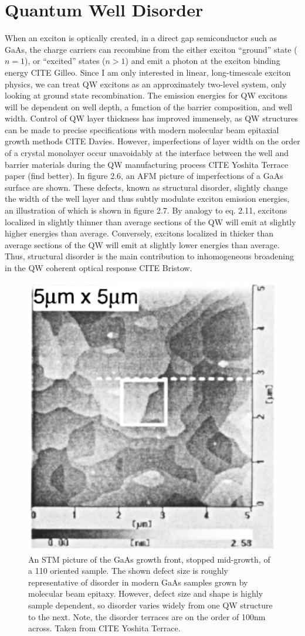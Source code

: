 \section{Quantum Well Disorder}
\indent When an exciton is optically created, in a direct gap semiconductor such as GaAs, the charge carriers can recombine from the either exciton ``ground'' state ($n=1$), or ``excited''  states ($n>1$) and emit a photon at the exciton binding energy CITE Gilleo. Since I am only interested in linear, long-timescale exciton physics, we can treat QW excitons as an approximately two-level system, only looking at ground state recombination. The emission energies for QW excitons will be dependent on well depth, a function of the barrier composition, and well width. Control of QW layer thickness has improved immensely, as QW structures can be made to precise specifications with modern molecular beam epitaxial growth methods CITE Davies. However, imperfections of layer width on the order of a crystal monolayer occur unavoidably at the interface between the well and barrier materials during the QW manufacturing process CITE Yoshita Terrace paper (find better). In figure 2.6, an AFM picture of imperfections of a GaAs surface are shown. These defects, known as structural disorder, slightly change the width of the well layer and thus subtly modulate exciton emission energies, an illustration of which is shown in figure 2.7. By analogy to eq. 2.11, excitons localized in slightly thinner than average sections of the QW will emit at slightly higher energies than average. Conversely, excitons localized in thicker than average sections of the QW will emit at slightly lower energies than average. Thus, structural disorder is the main contribution to inhomogeneous broadening in the QW coherent optical response CITE Bristow. 

\begin{figure}[h!]
\label{disorder}
\centering
\includegraphics[width = .4\textwidth]{disorder.eps}
\caption{\doublespacing An STM picture of the GaAs growth front, stopped mid-growth, of a 110 oriented sample. The shown defect size is roughly representative of disorder in modern GaAs samples grown by molecular beam epitaxy. However, defect size and shape is highly sample dependent, so disorder varies widely from one QW structure to the next. Note, the disorder terraces are on the order of 100nm across. Taken from CITE Yoshita Terrace.}
\label{rel}
\end{figure}

